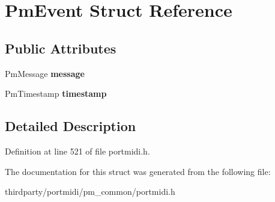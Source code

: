 \hypertarget{struct_pm_event}{}\section{Pm\+Event Struct Reference}
\label{struct_pm_event}
\subsection*{Public Attributes}
\begin{DoxyCompactItemize}
\item 
\mbox{\label{struct_pm_event_a2c8c12542447fdd566401fbf1a83d4e2}} 
Pm\+Message {\bfseries message}
\item 
\mbox{\label{struct_pm_event_a3854d39e3b89e1e2a4e1fda8d85c2f16}} 
Pm\+Timestamp {\bfseries timestamp}
\end{DoxyCompactItemize}


\subsection{Detailed Description}


Definition at line 521 of file portmidi.\+h.



The documentation for this struct was generated from the following file\+:\begin{DoxyCompactItemize}
\item 
thirdparty/portmidi/pm\+\_\+common/portmidi.\+h\end{DoxyCompactItemize}

